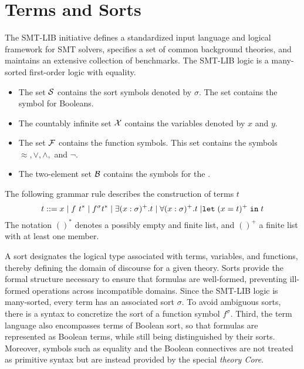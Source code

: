 \section{Terms and Sorts}

The SMT-LIB initiative \cite{smtlib} defines a standardized input language and logical framework for SMT solvers, specifies a set of common background theories, and maintains an extensive collection of benchmarks.
The SMT-LIB logic is a many-sorted first-order logic with equality.

\begin{itemize}
    \item The set $\cal{S}$ contains the sort symbols denoted by $\sigma$. The set contains the symbol  for Booleans.
    \item The countably infinite set $\cal{X}$ contains the variables denoted by $x$ and $y$.
    \item The set $\cal{F}$ contains the function symbols. This set contains the symbols $\approx, \lor, \land,$ and $\neg$.\index{$\approx$}
    \item The two-element set $\cal{B}$ contains the symbols for the .
\end{itemize}


\begin{definition}[Terms]\label{def:smt-grammar}
The following grammar rule describes the construction of terms $t$
\begin{equation*}
t ::= x \pipe f~t^* \pipe f^\sigma t^* \pipe \exists (x: \sigma)^+. t \pipe \forall (x: \sigma)^+. t \pipe \mathrel{\kw{let}} (x = t)^+ \mathrel{\kw{in}} t
\end{equation*}
The notation $()^*$ denotes a possibly empty and finite list, and $()^+$ a finite list with at least one member.
\end{definition}

A sort designates the logical type associated with terms, variables, and functions, thereby defining the domain of discourse for a given theory.
Sorts provide the formal structure necessary to ensure that formulas are well-formed, preventing ill-formed operations across incompatible domains.
Since the SMT-LIB logic is many-sorted, every term has an associated sort $\sigma$.
To avoid ambiguous sorts, there is a syntax to concretize the sort of a function symbol $f^\sigma$.
Third, the term language also encompasses terms of Boolean sort, so that formulas are represented as Boolean terms, while still being distinguished by their sorts.
Moreover, symbols such as equality and the Boolean connectives are not treated as primitive syntax but are instead provided by the special \emph{theory Core}.

